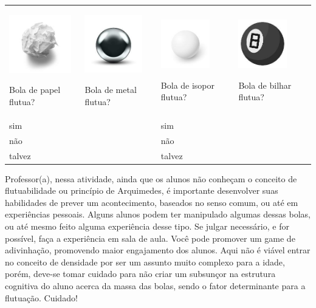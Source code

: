 \begin{longtable}[]{@{}llll@{}}
\toprule
\begin{minipage}[t]{0.24\columnwidth}\raggedright\strut
\includegraphics[width=1.06165in,height=0.99037in]{media/image88.jpg}

Bola de papel flutua?\strut
\end{minipage} & \begin{minipage}[t]{0.24\columnwidth}\raggedright\strut
\includegraphics[width=0.98125in,height=0.98125in]{media/image89.jpg}

Bola de metal flutua?\strut
\end{minipage} & \begin{minipage}[t]{0.24\columnwidth}\raggedright\strut
\includegraphics[width=0.83333in,height=0.83333in]{media/image90.jpg}

Bola de isopor flutua?\strut
\end{minipage} & \begin{minipage}[t]{0.24\columnwidth}\raggedright\strut
\includegraphics[width=0.83333in,height=0.83333in]{media/image91.jpg}

Bola de bilhar flutua?\strut
\end{minipage}\tabularnewline
sim & & sim &\tabularnewline
não & & não &\tabularnewline
talvez & & talvez &\tabularnewline
\bottomrule
\end{longtable}

Professor(a), nessa atividade, ainda que os alunos não conheçam o
conceito de flutuabilidade ou princípio de Arquimedes, é importante
desenvolver suas habilidades de prever um acontecimento, baseados no
senso comum, ou até em experiências pessoais. Alguns alunos podem ter
manipulado algumas dessas bolas, ou até mesmo feito alguma experiência
desse tipo. Se julgar necessário, e for possível, faça a experiência em
sala de aula. Você pode promover um game de adivinhação, promovendo
maior engajamento dos alunos. Aqui não é viável entrar no conceito de
densidade por ser um assunto muito complexo para a idade, porém, deve-se
tomar cuidado para não criar um subsunçor na estrutura cognitiva do
aluno acerca da massa das bolas, sendo o fator determinante para a
flutuação. Cuidado!

